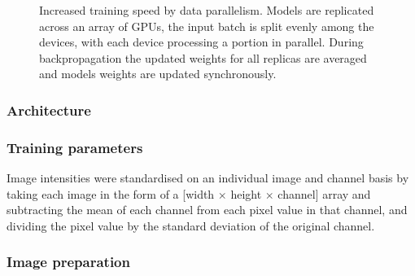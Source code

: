 \documentclass[a4paper,11pt,twoside,openright]{scrbook}
\begin{document}
\begin{figure}
    \captionsetup{width=0.8\textwidth}
    \caption[Multi-GPU distributed training]{Increased training speed by data parallelism. Models are replicated across an array of GPUs, the input batch is split evenly among the devices, with each device processing a portion in parallel.
During backpropagation the updated weights for all replicas are averaged and models weights are updated synchronously.}
    
    \label{figure:multi_GPU}
\end{figure}

\subsubsection{Architecture}


\subsubsection{Training parameters}

Image intensities were standardised on an individual image and channel basis by taking each image in the form of a [width $\times$ height $\times$ channel] array and subtracting the mean of each channel from each pixel value in that channel, and dividing the pixel value by the standard deviation of the original channel.




\subsubsection{Image preparation}

\end{document}
